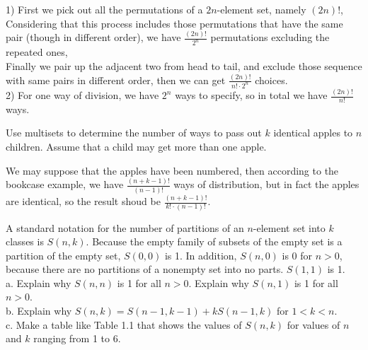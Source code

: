\documentclass[11pt, a4paper, UTF8]{ctexart}
\begin{document}

\begin{solution}
  1) First we pick out all the permutations of a $2n$-element set, namely $(2n)!$,\\
  Considering that this process includes those permutations that have the same pair
  (though in different order), we have $\frac{(2n)!}{2^{n}}$ permutations excluding 
  the repeated ones,\\
  Finally we pair up the adjacent two from head to tail, and exclude those sequence 
  with same pairs in different order, then we can get $\frac{(2n)!}{n! \cdot 2^{n}}$ 
  choices.\\
  2) For one way of division, we have $2^{n}$ ways to specify, so in total we have 
  $\frac{(2n)!}{n!}$ ways.
\end{solution}

\begin{problem}[CS: 1.5.4]
  Use multisets to determine the number of ways to pass out $k$ identical apples to 
  $n$ children. Assume that a child may get more than one apple.
\end{problem}

\begin{solution}
  We may suppose that the apples have been numbered, then according to the bookcase 
  example, we have $\frac{(n+k-1)!}{(n-1)!}$ ways of distribution, but in fact the 
  apples are identical, so the result shoud be $\frac{(n+k-1)!}{k! \cdot (n-1)!}$.
\end{solution}

\begin{problem}[CS: 1.5.12]
  A standard notation for the number of partitions of an $n$-element set into $k$ 
  classes is $S(n,k)$. Because the empty family of subsets of the empty set is a 
  partition of the empty set, $S(0,0)$ is 1. In addition, $S(n,0)$ is 0 for $n > 0$, 
  because there are no partitions of a nonempty set into no parts. $S(1,1)$ is 1.\\
  a. Explain why $S(n,n)$ is 1 for all $n > 0$. Explain why $S(n,1)$ is 1 for all 
  $n > 0$.\\
  b. Explain why $S(n,k) = S(n-1,k-1) + kS(n-1,k)$ for $1 < k < n$.\\
  c. Make a table like Table 1.1 that shows the values of $S(n,k)$ for values of $n$ 
  and $k$ ranging from 1 to 6.
\end{problem}
\end{document}
